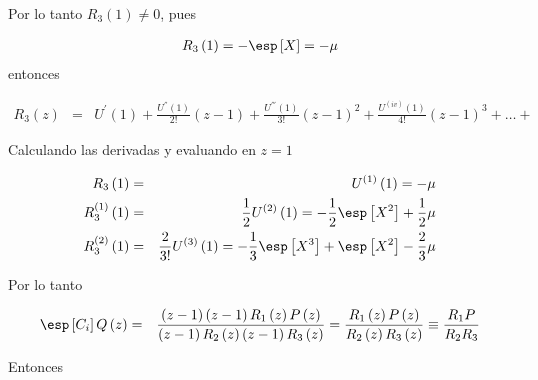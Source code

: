 Por lo tanto $R_{3}\left(1\right)\neq0$, pues

\begin{eqnarray}\label{Eq.R2}
R_{3}\left(1\right)=-\esp\left[X\right]=-\mu
\end{eqnarray}
entonces

\begin{eqnarray}
R_{3}\left(z\right)&=&U^{'}\left(1\right)+\frac{U^{''}\left(1\right)}{2!}\left(z-1\right)+\frac{U^{'''}\left(1\right)}{3!}\left(z-1\right)^{2}+\frac{U^{(iv)}\left(1\right)}{4!}\left(z-1\right)^{3}+\ldots+
\end{eqnarray}

Calculando las derivadas y evaluando en $z=1$

\begin{eqnarray}
R_{3}\left(1\right)&=&U^{(1)}\left(1\right)=-\mu\\
R_{3}^{(1)}\left(1\right)&=&\frac{1}{2}U^{(2)}\left(1\right)=-\frac{1}{2}\esp\left[X^{2}\right]+\frac{1}{2}\mu\\
R_{3}^{(2)}\left(1\right)&=&\frac{2}{3!}U^{(3)}\left(1\right)
=-\frac{1}{3}\esp\left[X^{3}\right]+\esp\left[X^{2}\right]-\frac{2}{3}\mu
\end{eqnarray}

Por lo tanto

\begin{eqnarray}
\esp\left[C_{i}\right]Q\left(z\right)&=&\frac{\left(z-1\right)\left(z-1\right)R_{1}\left(z\right)P\left(z\right)}{\left(z-1\right)R_{2}\left(z\right)\left(z-1\right)R_{3}\left(z\right)}
=\frac{R_{1}\left(z\right)P\left(z\right)}{R_{2}\left(z\right)R_{3}\left(z\right)}\equiv\frac{R_{1}P}{R_{2}R_{3}}
\end{eqnarray}

Entonces

